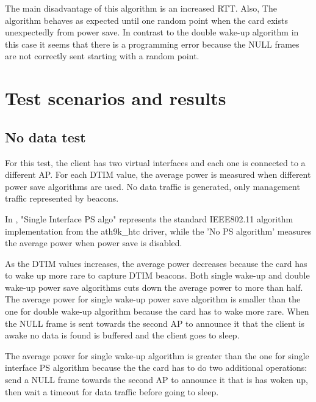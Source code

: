 The main disadvantage of this algorithm is an increased RTT. Also, The algorithm behaves as expected until one random point when the card exists unexpectedly from power save. In contrast to the double wake-up algorithm in this case it seems that there is a programming error because the NULL frames are not correctly sent starting with a random point.

\section{Test scenarios and results}
\label{sec:finallyresults}

\subsection{No data test}
\label{sub-sec:nodata}

For this test, the client has two virtual interfaces and each one is connected to a different AP. For each DTIM value, the average power is measured when different power save algorithms are used. No data traffic is generated, only management traffic represented by beacons.

In , "Single Interface PS algo" represents the standard IEEE802.11 algorithm implementation from the ath9k_htc driver, while the 'No PS algorithm' measures the average power when power save is disabled.

As the DTIM values increases, the average power decreases because the card has to wake up more rare to capture DTIM beacons. Both single wake-up and double wake-up power save algorithms cuts down the average power to more than half. The average power for single wake-up power save algorithm is smaller than the one for double wake-up algorithm because the card has to wake more rare. When the NULL frame is sent towards the second AP to announce it that the client is awake no data is found is buffered and the client goes to sleep. 

The average power for single wake-up algorithm is greater than the one for single interface PS algorithm because the the card has to do two additional operations: send a NULL frame towards the second AP to announce it that is has woken up, then wait a timeout for data traffic before going to sleep.     


